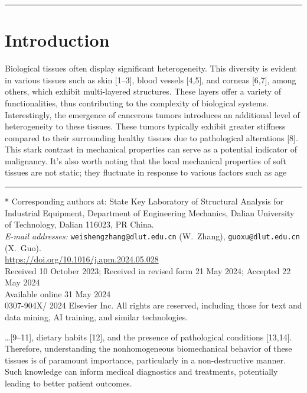 \documentclass[11pt]{article}
\begin{document}
\vspace{1.2em}
\hrule
\vspace{0.8em}

\section*{Introduction}

\noindent
Biological tissues often display significant heterogeneity. This
diversity is evident in various tissues such as skin [1--3], blood
vessels [4,5], and corneas [6,7], among others, which exhibit
multi-layered structures. These layers offer a variety of
functionalities, thus contributing to the complexity of biological
systems. Interestingly, the emergence of cancerous tumors introduces
an additional level of heterogeneity to these tissues. These tumors
typically exhibit greater stiffness compared to their surrounding
healthy tissues due to pathological alterations [8]. This stark
contrast in mechanical properties can serve as a potential indicator
of malignancy. It's also worth noting that the local mechanical
properties of soft tissues are not static; they fluctuate in response
to various factors such as age

\vfill
\hrule
\vspace{0.4em}
\noindent
{\footnotesize
* Corresponding authors at: State Key Laboratory of Structural
Analysis for Industrial Equipment, Department of Engineering
Mechanics, Dalian University of Technology, Dalian 116023, PR China.\\[2pt]
\textit{E-mail addresses:}
\texttt{weishengzhang@dlut.edu.cn} (W.~Zhang),
\texttt{guoxu@dlut.edu.cn} (X.~Guo).\\[4pt]
\url{https://doi.org/10.1016/j.apm.2024.05.028}\\[2pt]
Received 10 October 2023; Received in revised form 21 May 2024;
Accepted 22 May 2024\\[2pt]
Available online 31 May 2024\\[2pt]
0307-904X/\textcopyright{} 2024 Elsevier Inc. All rights are reserved,
including those for text and data mining, AI training, and similar
technologies.\par}

\newpage


\noindent
\ldots{}[9--11], dietary habits [12], and the presence of pathological
conditions [13,14]. Therefore, understanding the nonhomogeneous
biomechanical behavior of these tissues is of paramount importance,
particularly in a non-destructive manner. Such knowledge can inform
medical diagnostics and treatments, potentially leading to better
patient outcomes.
\end{document}
